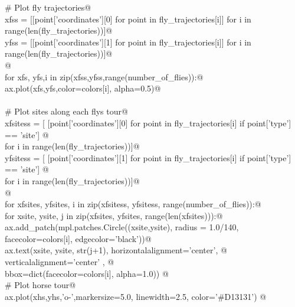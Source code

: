\documentclass[11.5pt]{report}
\begin{document}
\begin{flushleft}
\begin{minipage}{\linewidth}
\begin{list}{}{}
\mbox{}\verb@    # Plot fly trajectories@\\
\mbox{}\verb@    xfss = [[point['coordinates'][0] for point in fly_trajectories[i]] for i in range(len(fly_trajectories))]@\\
\mbox{}\verb@    yfss = [[point['coordinates'][1] for point in fly_trajectories[i]] for i in range(len(fly_trajectories))]@\\
\mbox{}\verb@ @\\
\mbox{}\verb@    for xfs, yfs,i in zip(xfss,yfss,range(number_of_flies)):@\\
\mbox{}\verb@        ax.plot(xfs,yfs,color=colors[i], alpha=0.5)@\\
\mbox{}\verb@@\\
\mbox{}\verb@    # Plot sites along each flys tour@\\
\mbox{}\verb@    xfsitess = [ [point['coordinates'][0] for point in fly_trajectories[i] if point['type'] == 'site'] @\\
\mbox{}\verb@                for i in range(len(fly_trajectories))]@\\
\mbox{}\verb@    yfsitess = [ [point['coordinates'][1] for point in fly_trajectories[i] if point['type'] == 'site'] @\\
\mbox{}\verb@                for i in range(len(fly_trajectories))]@\\
\mbox{}\verb@    @\\
\mbox{}\verb@    for xfsites, yfsites, i in zip(xfsitess, yfsitess, range(number_of_flies)):@\\
\mbox{}\verb@        for xsite, ysite, j in zip(xfsites, yfsites, range(len(xfsites))):@\\
\mbox{}\verb@              ax.add_patch(mpl.patches.Circle((xsite,ysite), radius = 1.0/140, \@\\
\mbox{}\verb@                                              facecolor=colors[i], edgecolor='black'))@\\
\mbox{}\verb@              ax.text(xsite, ysite, str(j+1), horizontalalignment='center', @\\
\mbox{}\verb@                                              verticalalignment='center'  , @\\
\mbox{}\verb@                                              bbox=dict(facecolor=colors[i], alpha=1.0)) @\\
\mbox{}\verb@    # Plot horse tour@\\
\mbox{}\verb@    ax.plot(xhs,yhs,'o-',markersize=5.0, linewidth=2.5, color='#D13131') @\\

\end{list}
\end{minipage}
\end{flushleft}
\end{document}

